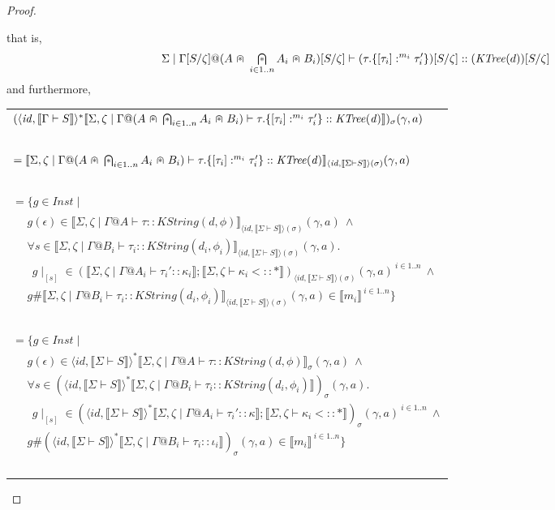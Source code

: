 \documentclass{article}
\newcommand{\sem}[1]{\llbracket #1 \rrbracket}
\newcommand{\capdot}{~\stackinset{c}{}{c}{}{\scalebox{0.8}{$\ast$}}{$\cap$}~}
\newcommand{\bigcapdot}{\mathop{\stackinset{c}{}{c}{}{\scalebox{0.8}{$\ast$}}{$\bigcap$}}}
\begin{document}
\begin{proof}
\begin{description}
that is,
$$\Sigma \mid \Gamma[S/\zeta] @ (A \capdot \bigcapdot_{i \in 1..n} A_i \capdot B_i)[S/\zeta] \vdash (\tau.\{ [\tau_i] :^{m_i} \tau'_i \})[S/\zeta] :: (\mathit{KTree}(d))[S/\zeta]$$
and furthermore,
\begin{center}
\begin{tabular}{l}
$(\langle \mathit{id}, \sem{\Gamma \vdash S} \rangle^* \sem{\Sigma,\zeta \mid \Gamma @ (A \capdot \bigcapdot_{i \in 1..n} A_i \capdot B_i) \vdash \tau.\{ [\tau_i] :^{m_i} \tau_i' \} :: \mathit{KTree(d)} })_\sigma (\gamma,a)$ \\~\\
$= \sem{\Sigma,\zeta \mid \Gamma @ (A \capdot \bigcapdot_{i \in 1..n} A_i \capdot B_i) \vdash \tau.\{ [\tau_i] :^{m_i} \tau_i' \} :: \mathit{KTree(d)} }_{\langle \mathit{id}, \sem{\Sigma \vdash S} \rangle(\sigma)}(\gamma,a)$ \\~\\

$= \{ g \in \mathit{Inst} \mid$ \\
$~~~~~~g(\epsilon) \in \sem{\Sigma,\zeta \mid \Gamma @ A \vdash \tau :: \mathit{KString(d,\phi)}}_{\langle \mathit{id}, \sem{\Sigma \vdash S} \rangle(\sigma)}(\gamma,a)~\wedge$ \\
$~~~~~~\forall s \in \sem{\Sigma,\zeta \mid \Gamma @ B_i \vdash \tau_i :: \mathit{KString}(d_i,\phi_i)}_{\langle \mathit{id}, \sem{\Sigma \vdash S} \rangle(\sigma)}(\gamma,a).$\\
$~~~~~~~~g \! \mid_{[s]} \in (\sem{\Sigma,\zeta \mid \Gamma @ A_i \vdash \tau_i' :: \kappa_i};\sem{\Sigma,\zeta \vdash \kappa_i <:: \ast})_{\langle \mathit{id}, \sem{\Sigma \vdash S} \rangle(\sigma)}(\gamma,a)^{~i \in 1..n}~\wedge$\\
$~~~~~~g \# \sem{\Sigma,\zeta \mid \Gamma @ B_i \vdash \tau_i :: \mathit{KString}(d_i,\phi_i)}_{\langle \mathit{id}, \sem{\Sigma \vdash S} \rangle(\sigma)}(\gamma,a) \in \sem{m_i}^{~i \in 1..n} \}$\\~\\

$= \{ g \in \mathit{Inst} \mid$ \\
$~~~~~~g(\epsilon) \in \langle \mathit{id}, \sem{\Sigma \vdash S} \rangle^* \sem{\Sigma,\zeta \mid \Gamma @ A \vdash \tau :: \mathit{KString(d,\phi)}}_{\sigma}(\gamma,a)~\wedge$ \\
$~~~~~~\forall s \in (\langle \mathit{id}, \sem{\Sigma \vdash S} \rangle^* \sem{\Sigma,\zeta \mid \Gamma @ B_i \vdash \tau_i :: \mathit{KString}(d_i,\phi_i)})_\sigma(\gamma,a).$\\
$~~~~~~~~g \! \mid_{[s]} \in (\langle \mathit{id}, \sem{\Sigma \vdash S} \rangle^* \sem{\Sigma,\zeta \mid \Gamma @ A_i \vdash \tau_i' :: \kappa};\sem{\Sigma,\zeta \vdash \kappa_i <:: \ast})_\sigma(\gamma,a)^{~i \in 1..n}~\wedge$\\
$~~~~~~g \# (\langle \mathit{id}, \sem{\Sigma \vdash S} \rangle^* \sem{\Sigma,\zeta \mid \Gamma @ B_i \vdash \tau_i :: \iota_i})_{\sigma}(\gamma,a) \in \sem{m_i}^{~i \in 1..n} \}$ \\~\\


\end{tabular}
\end{center}
\end{description}
\end{proof}
\end{document}

